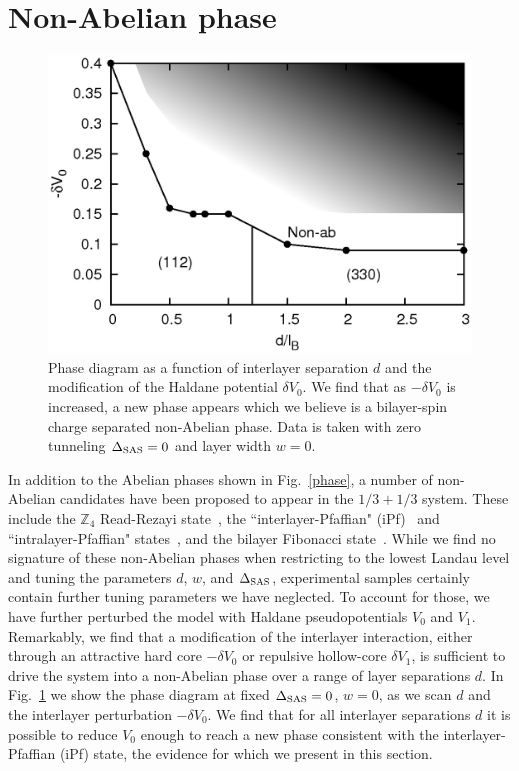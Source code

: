 
\section{Non-Abelian phase}
\label{sec:nonabelian}

\begin{figure}[ttt]
	\includegraphics[width=0.6\linewidth]{figures/V0phase.eps}
	\caption{Phase diagram as a function of interlayer separation $d$ and the modification of the Haldane potential $\delta V_0$. We find that as $-\delta V_0$ is increased, a new phase appears which we believe is a bilayer-spin charge separated non-Abelian phase. Data is taken with zero tunneling $\Delta_\textrm{SAS} = 0$ and layer width $w=0$.}
	\label{V0phase}
\end{figure}

In addition to the Abelian phases shown in Fig.~\ref{phase}, a number of non-Abelian candidates have been proposed to appear in the $1/3+1/3$ system.
These include the $\mathbb{Z}_4$ Read-Rezayi state~\cite{Read-PhysRevB.59.8084}, the ``interlayer-Pfaffian" (iPf)~\cite{Ardonne02} and ``intralayer-Pfaffian" states~\cite{Barkeshli10}, and the bilayer Fibonacci state~\cite{Vaezi14}.
While we find no signature of these non-Abelian phases when restricting to the lowest Landau level and tuning the parameters $d$, $w$, and $\Delta_\textrm{SAS}$, experimental samples certainly contain further tuning parameters we have neglected.
To account for those, we have further perturbed the model with Haldane pseudopotentials $V_0$ and $V_1$.
Remarkably, we find that a modification of the interlayer interaction, either through an attractive hard core $-\delta V_0$ or repulsive hollow-core $\delta V_1$, is sufficient to drive the system into a non-Abelian phase over a range of layer separations $d$. 
In Fig.~\ref{V0phase} we show the phase diagram at fixed $\Delta_\textrm{SAS} = 0$, $w = 0$, as we scan $d$ and the interlayer perturbation $-\delta V_0$.
We find that for all interlayer separations $d$ it is possible to reduce $V_0$ enough to reach a new phase consistent with the interlayer-Pfaffian (iPf) state, the evidence for which we present in this section.

